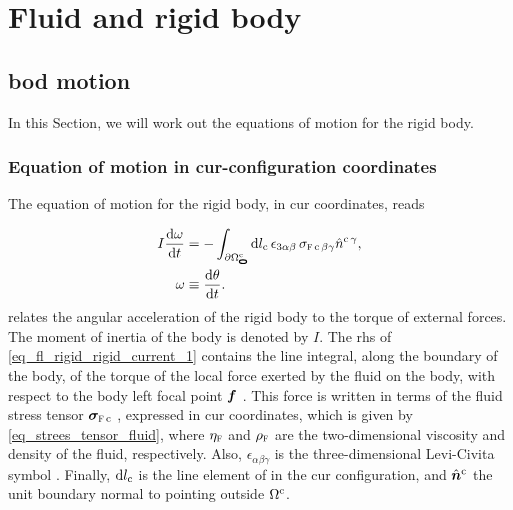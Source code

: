 \section{Fluid and rigid body}\label{app_sec_fl_rigid}


\subsection{\Acl{bod} motion}\label{sec_rigid_body_body}

In this Section, we will work out the equations of motion for the rigid body.

\subsubsection{Equation of motion in  \acl{cur}-configuration coordinates}\label{sec_rigid_body_body_current}

The equation of motion for the rigid body, in \ac{cur} coordinates, reads \cite{goldsteinClassicalMechanics2004}

\begin{align}
        \label{eq_fl_rigid_rigid_current_1}
        I         \der{\omega}{t}
               & =                                                                                             - \int_\pomellipseeqc \dint{l_\current} \, \epsilon_{3 \alpha \beta} \, \sigmastressc{\beta}{\gamma} \normalc{\gamma} , \\
        \label{eq_fl_rigid_rigid_current_2}
        \omega & \equiv \der{\theta}{t}.
\end{align}
 relates the angular acceleration of the rigid body to the torque of external forces.
The moment of inertia of the body is denoted by $I$. The \ac{rhs} of \cref{eq_fl_rigid_rigid_current_1} contains the line integral, along the boundary of the body, of the torque of the local force exerted by  the fluid on  the body, with respect to the body left focal point ${\bm {f}}$ \cite{landauFluidMechanics1987}.
This force is written in terms of the fluid stress tensor $\bsigmastressc$ \cite{landauFluidMechanics1987}, expressed in \ac{cur} coordinates, which is given by \cref{eq_strees_tensor_fluid}, where $\etaf$ and $\rhof$ are the two-dimensional viscosity and density of the fluid, respectively.
Also, $\epsilon_{\alpha \beta \gamma}$ is the three-dimensional Levi-Civita symbol \cite{marchiafavaAppuntiDiGeometria2005}.
Finally,   $\text{d} {l_{\textrm{c}}}$ is the line element of \pomellipsec in the \ac{cur} configuration, and $\hat{\bm n}^{\textrm{c}}$ the unit boundary normal to \pomellipsec pointing outside $\Omega^{\textrm{c}}$.



